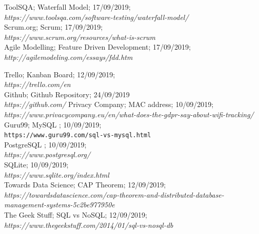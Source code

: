 \documentclass{report}
\begin{document}
\begin{thebibliography}{9}
    ToolSQA; Waterfall Model; 17/09/2019;\\ 
    \textit{https://www.toolsqa.com/software-testing/waterfall-model/} \\
    
    Scrum.org; Scrum; 17/09/2019;\\
    \textit{https://www.scrum.org/resources/what-is-scrum}\\
    
    Agile Modelling; Feature Driven Development; 17/09/2019; \\
    \textit{http://agilemodeling.com/essays/fdd.htm}
    
        Trello; Kanban Board; 12/09/2019; \\ 
        \textit{https://trello.com/en} \\
    
    Github; Github Repository; 24/09/2019 \\
    \textit{https://github.com/}
Privacy Company;  MAC address; 10/09/2019;
\textit{https://www.privacycompany.eu/en/what-does-the-gdpr-say-about-wifi-tracking/}\\
        
        Guru99; MySQL ; 10/09/2019; \\
        \texttt{https://www.guru99.com/sql-vs-mysql.html}\\
        
        PostgreSQL ; 10/09/2019; \\
        \textit{https://www.postgresql.org/} \\
        
        SQLite; 10/09/2019; \\
        \textit{https://www.sqlite.org/index.html}\\
        

        
        Towards Data Science; CAP Theorem; 12/09/2019; \\ 
        \textit{https://towardsdatascience.com/cap-theorem-and-distributed-database-management-systems-5c2be977950e} \\
        
        The Geek Stuff; SQL vs NoSQL; 12/09/2019;\\
        \textit{https://www.thegeekstuff.com/2014/01/sql-vs-nosql-db} \\
        

\end{thebibliography}
\end{document}
